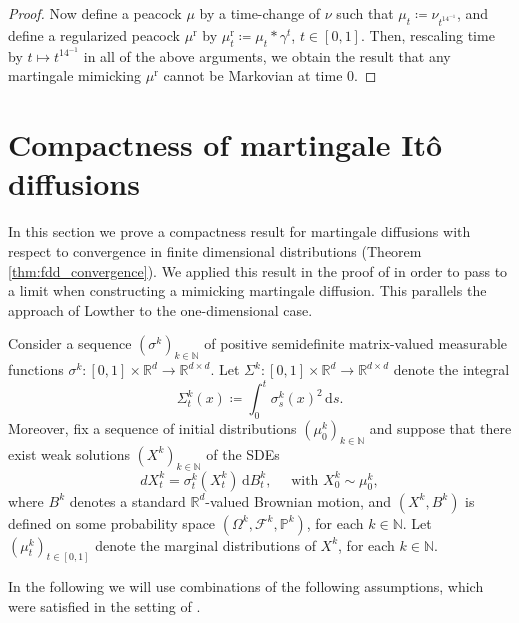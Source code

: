 \documentclass[12pt,oneside]{amsart}
\theoremstyle{definition}
\newcommand{\F}{\mathcal F}
\newcommand{\D}{\mathrm{d}}
\newcommand{\N}{\mathbb N}
\newcommand{\R}{\mathbb R}
\newcommand{\reg}{\mathrm{r}}
\def\P{{\mathbb P}}
\def\R{{\mathbb R}}
\numberwithin{equation}{section}
\begin{document}
\begin{proof}
    Now define a peacock $\mu$ by a time-change of $\nu$ such that $\mu_t \coloneqq \nu_{t^{14^{-1}}}$, and define a regularized peacock $\mu^\reg$ by $\mu^\reg_t \coloneqq \mu_t \ast \gamma^t$, $t \in [0, 1]$. Then, rescaling time by $t \mapsto t^{14^{-1}}$ in all of the above arguments, we obtain the result that any martingale mimicking $\mu^\reg$ cannot be Markovian at time $0$.
\end{proof}

\section{Compactness of martingale It\^o diffusions}\label{sec:compactness-Ito}

In this section we prove a compactness result for martingale diffusions with respect to convergence in finite dimensional distributions (Theorem \ref{thm:fdd_convergence}).
We applied this result in the proof of  in order to pass to a limit when constructing a mimicking martingale diffusion. This parallels the approach of Lowther \cite{Lo09} to the one-dimensional case.

Consider a sequence $(\sigma^k)_{k \in \N}$ of positive semidefinite matrix-valued measurable functions $\sigma^k \colon [0,1] \times \R^d \to \R^{d \times d}$.
Let $\Sigma^k \colon [0,1] \times \R^d \to \R^{d \times d}$ denote the integral
\begin{equation}
    \Sigma^k_t(x) \coloneqq \int_0^t \sigma_s^k(x)^2 \, \D s.
\end{equation}
Moreover, fix a sequence of initial distributions $(\mu_0^k)_{k \in \N}$ and suppose that there exist weak solutions $(X^k)_{k \in \N}$ of the SDEs
\begin{equation}\label{eq:sde-sequence}
    dX_t^k = \sigma^k_t(X_t^k) \, \D B^k_t, \quad \mbox{ with }X_0^k \sim \mu_0^k,
\end{equation}
where $B^k$ denotes a standard $\R^d$-valued Brownian motion, and $(X^k, B^k)$ is defined on some probability space $(\Omega^k, \F^k, \P^k)$, for each $k \in \N$.
Let $(\mu^k_t)_{t \in [0,1]}$ denote the marginal distributions of $X^k$, for each $k \in \N$.

In the following we will use combinations of the following assumptions, which were satisfied in the setting of .
\end{document}
